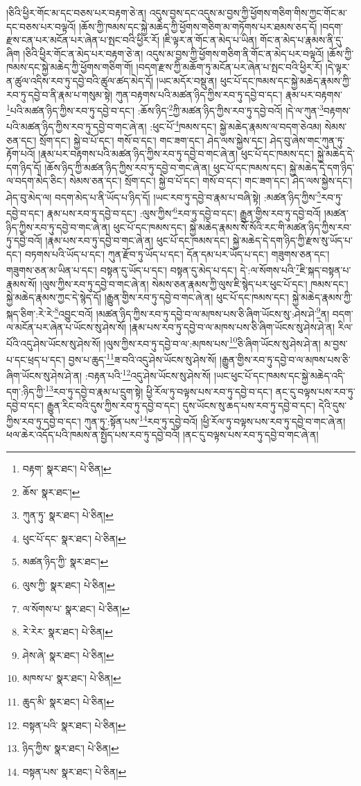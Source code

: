 །ཅིའི་ཕྱིར་གོང་མ་དང་བཅས་པར་བརྟག་ཅེ་ན། འདུས་བྱས་དང་འདུས་མ་བྱས་ཀྱི་ཕྱོགས་གཅིག་གིས་ཀྱང་གོང་མ་དང་བཅས་པར་བལྟའོ། །ཆོས་ཀྱི་ཁམས་དང་སྐྱེ་མཆེད་ཀྱི་ཕྱོགས་གཅིག་མ་གཏོགས་པར་ཐམས་ཅད་དོ། །བདག་རྫས་ངན་པར་མངོན་པར་ཞེན་པ་སྤང་བའི་ཕྱིར་རོ། །ཇི་ལྟར་ན་གོང་ན་མེད་པ་ཡིན། གོང་ན་མེད་པ་རྣམས་ནི་དུ་ཞིག །ཅིའི་ཕྱིར་གོང་ན་མེད་པར་བརྟག་ཅེ་ན། འདུས་མ་བྱས་ཀྱི་ཕྱོགས་གཅིག་ནི་གོང་ན་མེད་པར་བལྟའོ། །ཆོས་ཀྱི་ཁམས་དང་སྐྱེ་མཆེད་ཀྱི་ཕྱོགས་གཅིག་གོ། །བདག་རྫས་ཀྱི་མཆོག་ཏུ་མངོན་པར་ཞེན་པ་སྤང་བའི་ཕྱིར་རོ། །དེ་ལྟར་ན་ཚུལ་འདིས་རབ་ཏུ་དབྱེ་བའི་ཚུལ་ཚད་མེད་དོ། །ཡང་མདོར་བསྡུ་ན། ཕུང་པོ་དང་ཁམས་དང་སྐྱེ་མཆེད་རྣམས་ཀྱི་རབ་ཏུ་དབྱེ་བ་ནི་རྣམ་པ་གསུམ་སྟེ། ཀུན་བརྟགས་པའི་མཚན་ཉིད་ཀྱིས་རབ་ཏུ་དབྱེ་བ་དང་། རྣམ་པར་བརྟགས་\footnote{བརྟག་  སྣར་ཐང་།  པེ་ཅིན། }པའི་མཚན་ཉིད་ཀྱིས་རབ་ཏུ་དབྱེ་བ་དང་། :ཆོས་ཉིད་\footnote{ཆོས་  སྣར་ཐང་། }ཀྱི་མཚན་ཉིད་ཀྱིས་རབ་ཏུ་དབྱེ་བའོ། །དེ་ལ་ཀུན་\footnote{ཀུན་ཏུ་  སྣར་ཐང་།  པེ་ཅིན། }བརྟགས་པའི་མཚན་ཉིད་ཀྱིས་རབ་ཏུ་དབྱེ་བ་གང་ཞེ་ན། :ཕུང་པོ་\footnote{ཕུང་པོ་དང་  སྣར་ཐང་།  པེ་ཅིན། }ཁམས་དང་། སྐྱེ་མཆེད་རྣམས་ལ་བདག་ཅེའམ། སེམས་ཅན་དང་། སྲོག་དང་། སྐྱེ་བ་པོ་དང་། གསོ་བ་དང་། གང་ཟག་དང་། ཤེད་ལས་སྐྱེས་དང་། ཤེད་བུ་ཞེས་གང་ཀུན་ཏུ་རྟོག་པའོ། །རྣམ་པར་བརྟགས་པའི་མཚན་ཉིད་ཀྱིས་རབ་ཏུ་དབྱེ་བ་གང་ཞེ་ན། ཕུང་པོ་དང་ཁམས་དང་། སྐྱེ་མཆེད་དེ་དག་ཉིད་དོ། །ཆོས་ཉིད་ཀྱི་མཚན་ཉིད་ཀྱིས་རབ་ཏུ་དབྱེ་བ་གང་ཞེ་ན། ཕུང་པོ་དང་ཁམས་དང་། སྐྱེ་མཆེད་དེ་དག་ཉིད་ལ་བདག་མེད་ཅིང་། སེམས་ཅན་དང་། སྲོག་དང་། སྐྱེ་བ་པོ་དང་། གསོ་བ་དང་། གང་ཟག་དང་། ཤེད་ལས་སྐྱེས་དང་། ཤེད་བུ་མེད་ལ། བདག་མེད་པ་ནི་ཡོད་པ་ཉིད་དོ། །ཡང་རབ་ཏུ་དབྱེ་བ་རྣམ་པ་བཞི་སྟེ། :མཚན་ཉིད་ཀྱིས་\footnote{མཚན་ཉིད་ཀྱི་  སྣར་ཐང་། }རབ་ཏུ་དབྱེ་བ་དང་། རྣམ་པས་རབ་ཏུ་དབྱེ་བ་དང་། :ལུས་ཀྱིས་\footnote{ལུས་ཀྱི་  སྣར་ཐང་།  པེ་ཅིན། }རབ་ཏུ་དབྱེ་བ་དང་། རྒྱུན་གྱིས་རབ་ཏུ་དབྱེ་བའོ། །མཚན་ཉིད་ཀྱིས་རབ་ཏུ་དབྱེ་བ་གང་ཞེ་ན། ཕུང་པོ་དང་ཁམས་དང་། སྐྱེ་མཆེད་རྣམས་སོ་སོའི་རང་གི་མཚན་ཉིད་ཀྱིས་རབ་ཏུ་དབྱེ་བའོ། །རྣམ་པས་རབ་ཏུ་དབྱེ་བ་གང་ཞེ་ན། ཕུང་པོ་དང་ཁམས་དང་། སྐྱེ་མཆེད་དེ་དག་ཉིད་ཀྱི་རྫས་སུ་ཡོད་པ་དང་། བཏགས་པའི་ཡོད་པ་དང་། ཀུན་རྫོབ་ཏུ་ཡོད་པ་དང་། དོན་དམ་པར་ཡོད་པ་དང་། གཟུགས་ཅན་དང་། གཟུགས་ཅན་མ་ཡིན་པ་དང་། བསྟན་དུ་ཡོད་པ་དང་། བསྟན་དུ་མེད་པ་དང་། དེ་:ལ་སོགས་པའི་\footnote{ལ་སོགས་པ་  སྣར་ཐང་།  པེ་ཅིན། }ཇི་སྐད་བསྟན་པ་རྣམས་སོ། །ལུས་ཀྱིས་རབ་ཏུ་དབྱེ་བ་གང་ཞེ་ན། སེམས་ཅན་རྣམས་ཀྱི་ལུས་ཇི་སྙེད་པར་ཕུང་པོ་དང་། ཁམས་དང་། སྐྱེ་མཆེད་རྣམས་ཀྱང་དེ་སྙེད་དོ། །རྒྱུན་གྱིས་རབ་ཏུ་དབྱེ་བ་གང་ཞེ་ན། ཕུང་པོ་དང་ཁམས་དང་། སྐྱེ་མཆེད་རྣམས་ཀྱི་སྐད་ཅིག་:རེ་རེ་\footnote{རེ་རེར་  སྣར་ཐང་།  པེ་ཅིན། }འབྱུང་བའོ། །མཚན་ཉིད་ཀྱིས་རབ་ཏུ་དབྱེ་བ་ལ་མཁས་པས་ཅི་ཞིག་ཡོངས་སུ་:ཤེས་ཤེ་\footnote{ཤེས་ཞེ་  སྣར་ཐང་།  པེ་ཅིན། }ན། བདག་ལ་མངོན་པར་ཞེན་པ་ཡོངས་སུ་ཤེས་སོ། །རྣམ་པས་རབ་ཏུ་དབྱེ་བ་ལ་མཁས་པས་ཅི་ཞིག་ཡོངས་སུ་ཤེས་ཤེ་ན། རིལ་པོའི་འདུ་ཤེས་ཡོངས་སུ་ཤེས་སོ། །ལུས་ཀྱིས་རབ་ཏུ་དབྱེ་བ་ལ་:མཁས་པས་\footnote{མཁས་པ་  སྣར་ཐང་།  པེ་ཅིན། }ཅི་ཞིག་ཡོངས་སུ་ཤེས་ཤེ་ན། མ་བྱས་པ་དང་ཕྲད་པ་དང་། བྱས་པ་ཆུད་\footnote{ཆུད་མི་  སྣར་ཐང་།  པེ་ཅིན། }ཟ་བའི་འདུ་ཤེས་ཡོངས་སུ་ཤེས་སོ། །རྒྱུན་གྱིས་རབ་ཏུ་དབྱེ་བ་ལ་མཁས་པས་ཅི་ཞིག་ཡོངས་སུ་ཤེས་ཤེ་ན། :བརྟན་པའི་\footnote{བསྟན་པའི་  སྣར་ཐང་།  པེ་ཅིན། }འདུ་ཤེས་ཡོངས་སུ་ཤེས་སོ། །ཡང་ཕུང་པོ་དང་ཁམས་དང་སྐྱེ་མཆེད་འདི་དག་:ཉིད་ཀྱི་\footnote{ཉིད་ཀྱིས་  སྣར་ཐང་།  པེ་ཅིན། }རབ་ཏུ་དབྱེ་བ་རྣམ་པ་དྲུག་སྟེ། ཕྱི་རོལ་ཏུ་བལྟས་པས་རབ་ཏུ་དབྱེ་བ་དང་། ནང་དུ་བལྟས་པས་རབ་ཏུ་དབྱེ་བ་དང་། རྒྱུན་རིང་བའི་དུས་ཀྱིས་རབ་ཏུ་དབྱེ་བ་དང་། དུས་ཡོངས་སུ་ཆད་པས་རབ་ཏུ་དབྱེ་བ་དང་། དེའི་དུས་ཀྱིས་རབ་ཏུ་དབྱེ་བ་དང་། ཀུན་ཏུ་:སྟོན་པས་\footnote{བསྟན་པས་  སྣར་ཐང་།  པེ་ཅིན། }རབ་ཏུ་དབྱེ་བའོ། །ཕྱི་རོལ་ཏུ་བལྟས་པས་རབ་ཏུ་དབྱེ་བ་གང་ཞེ་ན། ཕལ་ཆེར་འདོད་པའི་ཁམས་ན་སྤྱོད་པས་རབ་ཏུ་དབྱེ་བའོ། །ནང་དུ་བལྟས་པས་རབ་ཏུ་དབྱེ་བ་གང་ཞེ་ན། 